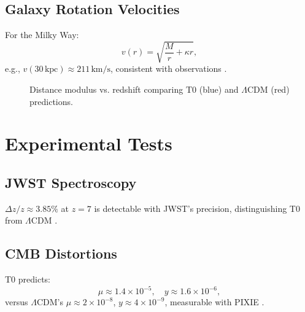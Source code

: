 \documentclass[twocolumn,aps,prl]{revtex4-2}
\newcommand{\LCDM}{\Lambda\text{CDM}}
\begin{document}
	\subsection{Galaxy Rotation Velocities}
	\label{subsec:rotation_velocity_prediction}
	
	For the Milky Way:
	\begin{equation}
		v(r) = \sqrt{\frac{M}{r} + \kappa r},
		\label{eq:rotation_velocity_repeat}
	\end{equation}
	e.g., \(v(30 \, \text{kpc}) \approx 211 \, \text{km/s}\), consistent with observations \cite{McGaugh2016}.
	
	\begin{figure}[ht]
		\centering
		\caption{Distance modulus vs. redshift comparing T0 (blue) and \(\LCDM\) (red) predictions.}
		\label{fig:distance_modulus}
	\end{figure}
	
	\section{Experimental Tests}
	\label{sec:tests}
	
	\subsection{JWST Spectroscopy}
	\label{subsec:jwst_test}
	
	\(\Delta z / z \approx 3.85\%\) at \(z = 7\) is detectable with JWST’s precision, distinguishing T0 from \(\LCDM\) \cite{pascher_params_2025}.
	
	\subsection{CMB Distortions}
	\label{subsec:cmb_distortions_test}
	
	T0 predicts:
	\begin{equation}
		\mu \approx 1.4 \times 10^{-5}, \quad y \approx 1.6 \times 10^{-6},
		\label{eq:distortion_parameters}
	\end{equation}
	versus \(\LCDM\)’s \(\mu \approx 2 \times 10^{-8}\), \(y \approx 4 \times 10^{-9}\), measurable with PIXIE \cite{pascher_temp_2025}.
	
\end{document}
